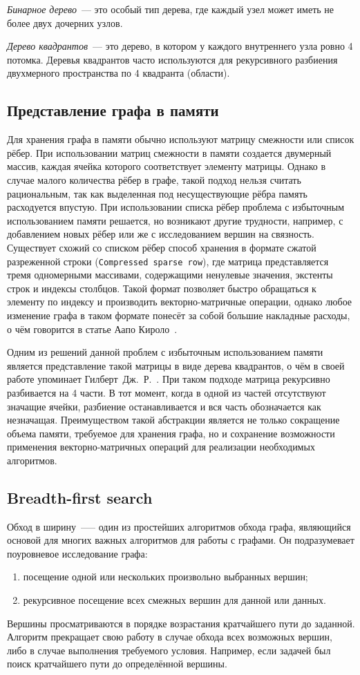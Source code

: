 \textit{Бинарное дерево}~---  это особый тип дерева, где каждый узел может иметь не более двух дочерних узлов.

\textit{Дерево квадрантов}~--- это дерево, в котором у каждого внутреннего узла ровно 4 потомка. Деревья квадрантов часто используются для рекурсивного разбиения двухмерного пространства по 4 квадранта (области).

\subsection{Представление графа в памяти}
Для хранения графа в памяти обычно используют матрицу смежности или список рёбер. При использовании матриц смежности в памяти создается двумерный массив, каждая ячейка которого соответствует элементу матрицы. Однако в случае малого количества рёбер в графе, такой подход нельзя считать рациональным, так как выделенная под несуществующие рёбра память расходуется впустую. При использовании списка рёбер проблема с избыточным использованием памяти решается, но возникают другие трудности, например, с добавлением новых рёбер или же с исследованием вершин на связность. Существует схожий со списком рёбер способ хранения в формате сжатой разреженной строки (\texttt{Compressed sparse row}), где матрица представляется тремя одномерными массивами, содержащими ненулевые значения, экстенты строк и индексы столбцов. Такой формат позволяет быстро обращаться к элементу по индексу и производить векторно-матричные операции, однако любое изменение графа в таком формате понесёт за собой большие накладные расходы, о чём говорится в статье Аапо Кироло~\cite{10.5555/2387880.2387884}.

Одним из решений данной проблем с избыточным использованием памяти является представление такой матрицы в виде дерева квадрантов, о чём в своей работе упоминает Гилберт~Дж.~Р.~\cite{bulucc2012parallel}. При таком подходе матрица рекурсивно разбивается на 4 части. В тот момент, когда в одной из частей отсутствуют значащие ячейки, разбиение останавливается и вся часть обозначается как незначащая. Преимуществом такой абстракции является не только сокращение объема памяти, требуемое для хранения графа, но и сохранение возможности применения векторно-матричных операций для реализации необходимых алгоритмов.

\subsection{Breadth-first search}
Обход в ширину~—-- один из простейших алгоритмов обхода графа, являющийся основой для многих важных алгоритмов для работы с графами. Он подразумевает поуровневое исследование графа:
\begin{enumerate}
\item  посещение одной или нескольких произвольно выбранных вершин;
\item  рекурсивное посещение всех смежных вершин для данной или данных.
\end{enumerate}
Вершины просматриваются в порядке возрастания кратчайшего пути до заданной. Алгоритм прекращает свою работу в случае обхода всех возможных вершин, либо в случае выполнения требуемого условия. Например, если задачей был поиск кратчайшего пути до определённой вершины. 

